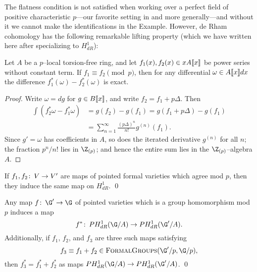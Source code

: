 
The flatness condition is not satisfied when working over a perfect field of positive characteristic \(p\)---our favorite setting in  and  more generally---and without it we cannot make the identifications in the Example.  However, de Rham cohomology has the following remarkable lifting property (which we have written here after specializing to \(H^1_{dR}\)):

\begin{theorem}
Let \(A\) be a \(p\)--local torsion-free ring, and let \(f_1(x), f_2(x) \in x A\llbracket{x}\rrbracket\) be power series without constant term.  If \(f_1 \equiv f_2 \pmod{p}\), then for any differential \(\omega \in A\llbracket{x}\rrbracket dx\) the difference \(f_1^*(\omega) - f_2^*(\omega)\) is exact.
\end{theorem}
\begin{proof}
Write \(\omega = dg\) for \(g \in B\llbracket{x}\rrbracket\), and write \(f_2 = f_1 + p\Delta\).  Then
\begin{align*}
\int \left( f_2^* \omega - f_1^* \omega \right) & = g(f_2) - g(f_1) = g(f_1 + p\Delta) - g(f_1) \\
& = \sum_{n = 1}^\infty \frac{(p\Delta)^n}{n!} g^{(n)}(f_1).
\end{align*}
Since \(g' = \omega\) has coefficients in \(A\), so does the iterated derivative \(g^{(n)}\) for all \(n\); the fraction \(p^n/n!\) lies in \(\Z_{(p)}\); and hence the entire sum lies in the \(\Z_{(p)}\)--algebra \(A\).
\end{proof}

\begin{corollary}\label{H1dRIsCrystalline}
If \(f_1, f_2\colon\thinspace V \to V'\) are maps of pointed formal varieties which agree mod \(p\), then they induce the same map on \(H^1_{dR}\). \qed
\end{corollary}

\begin{corollary}
Any map \(f\co \G' \to \G\) of pointed varieties which is a group homomorphism mod \(p\) induces a map \[f^*\co PH^1_{dR}(\G/A) \to PH^1_{dR}(\G'/A).\]  Additionally, if \(f_1\), \(f_2\), and \(f_3\) are three such maps satisfying \[f_3 \equiv f_1 + f_2 \in \CatOf{FormalGroups}(\G'/p, \G/p),\] then \(f_3^* = f_1^* + f_2^*\) as maps \(PH^1_{dR}(\G/A) \to PH^1_{dR}(\G'/A)\). \qed
\end{corollary}

